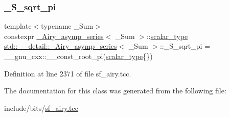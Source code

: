 \subsubsection{\texorpdfstring{\+\_\+\+S\+\_\+sqrt\+\_\+pi}{\_S\_sqrt\_pi}}
{\footnotesize\ttfamily template$<$typename \+\_\+\+Sum$>$ \\
constexpr \hyperlink{classstd_1_1____detail_1_1__Airy__asymp__series}{\+\_\+\+Airy\+\_\+asymp\+\_\+series}$<$ \+\_\+\+Sum $>$\+::\hyperlink{classstd_1_1____detail_1_1__Airy__asymp__series_ac2d0fa6d86d7a83c06dca057d0dfec3a}{scalar\+\_\+type} \hyperlink{classstd_1_1____detail_1_1__Airy__asymp__series}{std\+::\+\_\+\+\_\+detail\+::\+\_\+\+Airy\+\_\+asymp\+\_\+series}$<$ \+\_\+\+Sum $>$\+::\+\_\+\+S\+\_\+sqrt\+\_\+pi = \+\_\+\+\_\+gnu\+\_\+cxx\+::\+\_\+\+\_\+const\+\_\+root\+\_\+pi(\hyperlink{classstd_1_1____detail_1_1__Airy__asymp__series_ac2d0fa6d86d7a83c06dca057d0dfec3a}{scalar\+\_\+type}\{\})\hspace{0.3cm}{\ttfamily [static]}}



Definition at line 2371 of file sf\+\_\+airy.\+tcc.



The documentation for this class was generated from the following file\+:\begin{DoxyCompactItemize}
\item 
include/bits/\hyperlink{sf__airy_8tcc}{sf\+\_\+airy.\+tcc}\end{DoxyCompactItemize}
